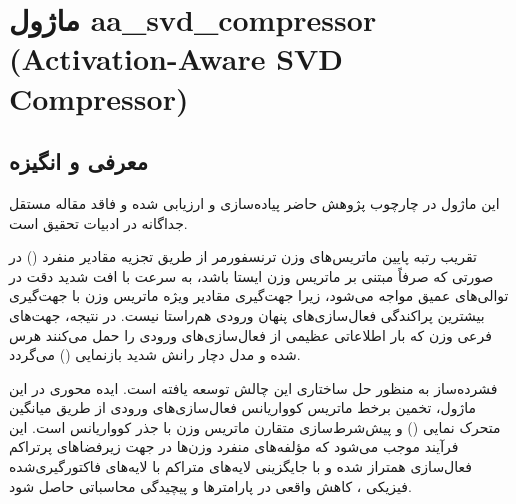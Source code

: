 \section{ماژول aa\_svd\_compressor (Activation-Aware SVD Compressor)}
\label{sec:module_aa_svd_compressor}

\subsection{معرفی و انگیزه}
این ماژول در چارچوب پژوهش حاضر پیاده‌سازی و ارزیابی شده و فاقد مقاله مستقل جداگانه در ادبیات تحقیق است.

تقریب رتبه پایین ماتریس‌های وزن ترنسفورمر از طریق تجزیه مقادیر منفرد () در صورتی که صرفاً مبتنی بر ماتریس وزن ایستا باشد، به سرعت با افت شدید دقت در توالی‌های عمیق مواجه می‌شود، زیرا جهت‌گیری مقادیر ویژه ماتریس وزن با جهت‌گیری بیشترین پراکندگی فعال‌سازی‌های پنهان ورودی هم‌راستا نیست. در نتیجه، جهت‌های فرعی وزن که بار اطلاعاتی عظیمی از فعال‌سازی‌های ورودی را حمل می‌کنند هرس شده و مدل دچار رانش شدید بازنمایی () می‌گردد.

فشرده‌ساز  به منظور حل ساختاری این چالش توسعه یافته است. ایده محوری در این ماژول، تخمین برخط ماتریس کوواریانس فعال‌سازی‌های ورودی از طریق میانگین متحرک نمایی () و پیش‌شرط‌سازی متقارن ماتریس وزن با جذر کوواریانس است. این فرآیند موجب می‌شود که مؤلفه‌های منفرد وزن‌ها در جهت زیرفضاهای پرتراکم فعال‌سازی همتراز شده و با جایگزینی لایه‌های متراکم با لایه‌های فاکتورگیری‌شده فیزیکی ، کاهش واقعی در پارامترها و پیچیدگی محاسباتی حاصل شود.

